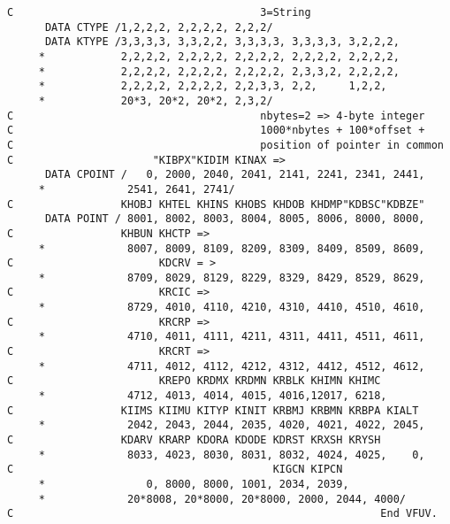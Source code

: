 \begin{verbatim}
C                                       3=String
      DATA CTYPE /1,2,2,2, 2,2,2,2, 2,2,2/
      DATA KTYPE /3,3,3,3, 3,3,2,2, 3,3,3,3, 3,3,3,3, 3,2,2,2,
     *            2,2,2,2, 2,2,2,2, 2,2,2,2, 2,2,2,2, 2,2,2,2,
     *            2,2,2,2, 2,2,2,2, 2,2,2,2, 2,3,3,2, 2,2,2,2,
     *            2,2,2,2, 2,2,2,2, 2,2,3,3, 2,2,     1,2,2,
     *            20*3, 20*2, 20*2, 2,3,2/
C                                       nbytes=2 => 4-byte integer
C                                       1000*nbytes + 100*offset +
C                                       position of pointer in common
C                      "KIBPX"KIDIM KINAX =>
      DATA CPOINT /   0, 2000, 2040, 2041, 2141, 2241, 2341, 2441,
     *             2541, 2641, 2741/
C                 KHOBJ KHTEL KHINS KHOBS KHDOB KHDMP"KDBSC"KDBZE"
      DATA POINT / 8001, 8002, 8003, 8004, 8005, 8006, 8000, 8000,
C                 KHBUN KHCTP =>
     *             8007, 8009, 8109, 8209, 8309, 8409, 8509, 8609,
C                       KDCRV = >
     *             8709, 8029, 8129, 8229, 8329, 8429, 8529, 8629,
C                       KRCIC =>
     *             8729, 4010, 4110, 4210, 4310, 4410, 4510, 4610,
C                       KRCRP =>
     *             4710, 4011, 4111, 4211, 4311, 4411, 4511, 4611,
C                       KRCRT =>
     *             4711, 4012, 4112, 4212, 4312, 4412, 4512, 4612,
C                       KREPO KRDMX KRDMN KRBLK KHIMN KHIMC
     *             4712, 4013, 4014, 4015, 4016,12017, 6218,
C                 KIIMS KIIMU KITYP KINIT KRBMJ KRBMN KRBPA KIALT
     *             2042, 2043, 2044, 2035, 4020, 4021, 4022, 2045,
C                 KDARV KRARP KDORA KDODE KDRST KRXSH KRYSH
     *             8033, 4023, 8030, 8031, 8032, 4024, 4025,    0,
C                                         KIGCN KIPCN
     *                0, 8000, 8000, 1001, 2034, 2039,
     *             20*8008, 20*8000, 20*8000, 2000, 2044, 4000/
C                                                          End VFUV.

\end{verbatim}
